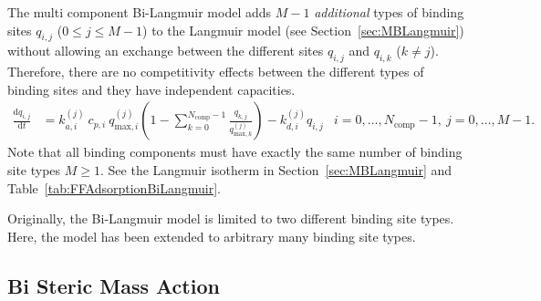 The multi component Bi-Langmuir model \cite{Guiochon2006} adds $M - 1$ \emph{additional} types of binding sites $q_{i,j}$ ($0 \leq j \leq M - 1$) to the Langmuir model (see Section~\ref{sec:MBLangmuir}) without allowing an exchange between the different sites $q_{i,j}$ and $q_{i,k}$ ($k \neq j$). 
Therefore, there are no competitivity effects between the different types of binding sites and they have independent capacities.
\begin{align*}
  \frac{\mathrm{d} q_{i,j}}{\mathrm{d} t} &=  k_{a,i}^{(j)}\: c_{p,i}\: q_{\text{max},i}^{(j)} \left( 1 - \sum_{k=0}^{N_{\text{comp}} - 1} \frac{q_{k,j}}{q_{\text{max},k}^{(j)}}\right) - k_{d,i}^{(j)} q_{i,j} & i = 0, \dots, N_{\text{comp}} - 1, \: j = 0, \dots, M - 1.%
\end{align*}
Note that all binding components must have exactly the same number of binding site types $M \geq 1$.
See the Langmuir isotherm in Section~\ref{sec:MBLangmuir} and Table~\ref{tab:FFAdsorptionBiLangmuir}.

Originally, the Bi-Langmuir model is limited to two different binding site types.
Here, the model has been extended to arbitrary many binding site types.

\subsection{Bi Steric Mass Action}


